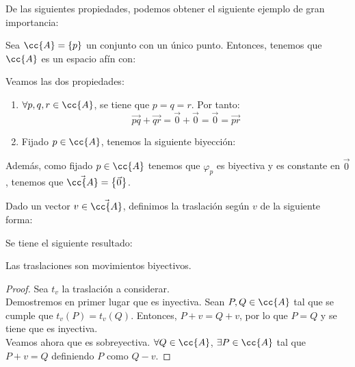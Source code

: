 De las siguientes propiedades, podemos obtener el siguiente ejemplo de gran importancia:
\begin{ejemplo}\label{ej:espacio_afin_punto}
    Sea $\cc{A}=\{p\}$ un conjunto con un único punto. Entonces, tenemos que $\cc{A}$ es un espacio afín con:

        Veamos las dos propiedades:
        \begin{enumerate}
            \item $\forall p,q,r\in \cc{A}$, se tiene que $p=q=r$. Por tanto:
            \begin{equation*}
                \vec{pq} + \vec{qr} = \vec{0} + \vec{0} = \vec{0} = \vec{pr}
            \end{equation*}

            \item Fijado $p\in \cc{A}$, tenemos la siguiente biyección:
        \end{enumerate}

        Además, como fijado $p\in \cc{A}$ tenemos que $\varphi_p$ es biyectiva
        y es constante en $\vec{0}$, tenemos que $\vec{\cc{A}}=\left\{\vec{0}\right\}$.
\end{ejemplo}


\begin{definicion}[Traslación]\label{def:traslacion}
    Dado un vector $v\in \vec{\cc{A}}$, definimos la traslación según $v$ de la siguiente forma:
\end{definicion}

Se tiene el siguiente resultado:
\begin{prop}
    Las traslaciones son movimientos biyectivos.
\end{prop}
\begin{proof}
    Sea $t_v$ la traslación a considerar.\\
    
    Demostremos en primer lugar que es inyectiva. Sean $P,Q\in \cc{A}$ tal que se cumple que $t_v(P)=t_v(Q)$. Entonces, $P+v=Q+v$, por lo que $P=Q$ y se tiene que es inyectiva.\\

    Veamos ahora que es sobreyectiva. $\forall Q\in \cc{A}$, $\exists P\in \cc{A}$ tal que $P+v=Q$ definiendo $P$ como $Q-v$.
\end{proof}

